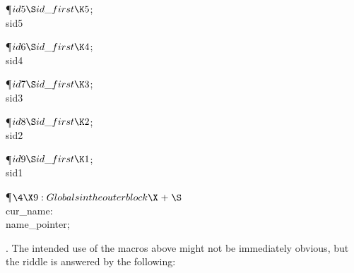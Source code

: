 \P\D {}$\\{id5}\S\\{id\_first}\K5$;\5
\\{sid5}\par
\P\D {}$\\{id6}\S\\{id\_first}\K4$;\5
\\{sid4}\par
\P\D {}$\\{id7}\S\\{id\_first}\K3$;\5
\\{sid3}\par
\P\D {}$\\{id8}\S\\{id\_first}\K2$;\5
\\{sid2}\par
\P\D {}$\\{id9}\S\\{id\_first}\K1$;\5
\\{sid1}\par
\Y\P$\4\X9:Globals in the outer block\X\mathrel{+}\S$\6
\4\\{cur\_name}: \\{name\_pointer};\par
\fi

. The intended use of the macros above might not be immediately obvious,
but the riddle is answered by the following:

